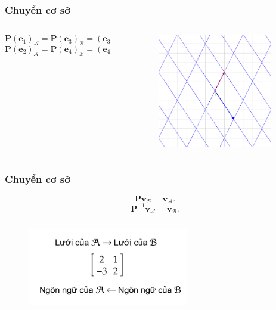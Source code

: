 \begin{frame}
    \frametitle{Chuyển cơ sở}
    \begin{columns}
        \begin{column}{0.5\textwidth}
        

          \[\mathbf{P}(\mathbf{e}_1)_{\mathcal{A}}=\mathbf{P}(\mathbf{e}_3)_{\mathcal{B}}=(\mathbf{e}_3)_{\mathcal{A}},\]
\[\mathbf{P}(\mathbf{e}_2)_{\mathcal{A}}=\mathbf{P}(\mathbf{e}_4)_{\mathcal{B}}=(\mathbf{e}_4)_{\mathcal{A}}.\] 
        \end{column}
        \begin{column}{0.5\textwidth}
            \begin{figure}
                \centering
                \includegraphics[width=7cm, height=5cm]{Slides/Figure/LT10.png}
            \end{figure}
        \end{column}
    \end{columns}
\end{frame}
\begin{frame}
    \frametitle{Chuyển cơ sở}
            \begin{equation*}
                \mathbf{P}\mathbf{v}_{\mathcal{B}}=\mathbf{v}_{\mathcal{A}}.
            \end{equation*}
        \begin{equation*}
            \mathbf{P}^{-1}\mathbf{v}_{\mathcal{A}}=\mathbf{v}_{\mathcal{B}}.
        \end{equation*}
                \begin{figure}[H]
        \centering
        \includegraphics[width=7cm, height=4cm]{Slides/Figure/final.png}
    \end{figure}

\end{frame}
